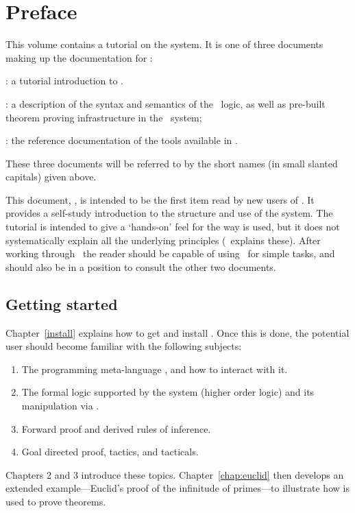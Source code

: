 \chapter*{Preface}
\label{intro}

This volume contains a tutorial on the \HOL{} system.  It is one of three
documents making up the documentation for \HOL:

\begin{myenumerate}
\item \TUTORIAL: a tutorial introduction to \HOL.
\item \DESCRIPTION: a description of the syntax and semantics of 
      the \HOL\ logic, as well as pre-built theorem proving infrastructure
      in the \HOL\ system;
\item \REFERENCE: the reference documentation of the tools available
  in \HOL.
\end{myenumerate}

\noindent These three documents will be referred to by the short names (in
small slanted capitals) given above.

This document, \TUTORIAL, is intended to be the first item read by new
users of \HOL.  It provides a self-study introduction to the structure
and use of the system.  The tutorial is intended to give a `hands-on'
feel for the way \HOL{} is used, but it does not systematically explain
all the underlying principles (\DESCRIPTION\ explains these).  After
working through \TUTORIAL\ the reader should be capable of using \HOL\
for simple tasks, and should also be in a position to consult the
other two documents.

\section*{Getting started}

Chapter~\ref{install} explains how to get and install \HOL.  Once this
is done, the potential \HOL{} user should become familiar with the
following subjects:
%
\begin{enumerate}
\item The programming meta-language \ML, and how to interact with it.
\item The formal logic supported by the \HOL{} system (higher order
  logic) and its manipulation via \ML.
\item Forward proof and derived rules of inference.
\item Goal directed proof, tactics, and tacticals.
\end{enumerate}
%
Chapters 2 and 3 introduce these topics.
Chapter~\ref{chap:euclid} then develops an extended example---Euclid's
proof of the infinitude of primes---to illustrate how \HOL{} is used
to prove theorems. 

